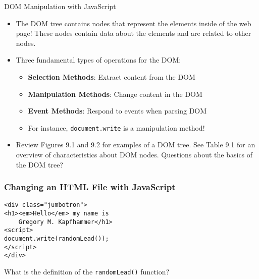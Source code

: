 \documentclass[14pt,aspectratio=169]{beamer}
\begin{document}
%
\begin{frame}{DOM Manipulation with JavaScript}
  \begin{itemize}
    \item The DOM tree contains nodes that represent the elements inside of the
      web page! These nodes contain data about the elements and are related to
      other nodes.
      \vspace*{-.15in}
    \item Three fundamental types of operations for the DOM:
      \begin{itemize}
        \item {\bf Selection Methods}: Extract content from the DOM
        \item {\bf Manipulation Methods}: Change content in the DOM
        \item {\bf Event Methods}: Respond to events when parsing DOM
        \item For instance, {\tt document.write} is a manipulation method!
      \end{itemize}
      \vspace*{-.25in}
    \item Review Figures 9.1 and 9.2 for examples of a DOM tree. See Table 9.1
      for an overview of characteristics about DOM nodes. Questions about
      the basics of the DOM tree?
  \end{itemize}
\end{frame}

%
\begin{frame}[fragile]
  \frametitle{Changing an HTML File with JavaScript}
  \normalsize
  \begin{minipage}{6in}
    \vspace*{.2in}
    \begin{verbatim}
<div class="jumbotron">
<h1><em>Hello</em> my name is
    Gregory M. Kapfhammer</h1>
<script>
document.write(randomLead());
</script>
</div>
    \end{verbatim}
  \end{minipage}
  \vspace*{.1in}
  \begin{center}
    What is the definition of the {\tt randomLead()} function?
  \end{center}
\end{frame}
\end{document}
